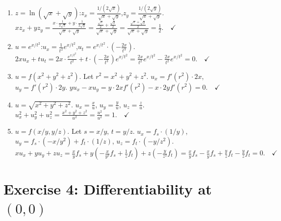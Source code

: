 \documentclass[12pt,a4paper]{article}
\begin{document}
\begin{enumerate}[leftmargin=*, label=(\alph*)]

\item $z=\ln(\sqrt{x}+\sqrt{y})$:\quad $z_x=\frac{1/(2\sqrt{x})}{\sqrt{x}+\sqrt{y}}$,\quad $z_y=\frac{1/(2\sqrt{y})}{\sqrt{x}+\sqrt{y}}$.
$xz_x+yz_y=\frac{x\cdot\frac{1}{2\sqrt{x}}+y\cdot\frac{1}{2\sqrt{y}}}{\sqrt{x}+\sqrt{y}}=\frac{\frac{\sqrt{x}}{2}+\frac{\sqrt{y}}{2}}{\sqrt{x}+\sqrt{y}}=\frac{\frac{\sqrt{x}+\sqrt{y}}{2}}{\sqrt{x}+\sqrt{y}}=\frac{1}{2}.\quad\checkmark$

\item $u=e^{x/t^2}$:\quad $u_x=\frac{1}{t^2}e^{x/t^2}$,\quad $u_t=e^{x/t^2}\cdot\left(-\frac{2x}{t^3}\right)$.
$2xu_x+tu_t=2x\cdot\frac{e^{x/t^2}}{t^2}+t\cdot\left(-\frac{2x}{t^3}\right)e^{x/t^2}=\frac{2x}{t^2}e^{x/t^2}-\frac{2x}{t^2}e^{x/t^2}=0.\quad\checkmark$

\item $u=f(x^2+y^2+z^2)$. Let $r^2=x^2+y^2+z^2$. $u_x=f'(r^2)\cdot 2x$, $u_y=f'(r^2)\cdot 2y$.
$yu_x-xu_y=y\cdot 2xf'(r^2)-x\cdot 2yf'(r^2)=0.\quad\checkmark$

\item $u=\sqrt{x^2+y^2+z^2}$. $u_x=\frac{x}{u}$, $u_y=\frac{y}{u}$, $u_z=\frac{z}{u}$.
$u_x^2+u_y^2+u_z^2=\frac{x^2+y^2+z^2}{u^2}=\frac{u^2}{u^2}=1.\quad\checkmark$

\item $u=f(x/y, y/z)$. Let $s=x/y$, $t=y/z$.
$u_x=f_s\cdot(1/y)$, $u_y=f_s\cdot(-x/y^2)+f_t\cdot(1/z)$, $u_z=f_t\cdot(-y/z^2)$.
$xu_x+yu_y+zu_z=\frac{x}{y}f_s+y\left(-\frac{x}{y^2}f_s+\frac{1}{z}f_t\right)+z\left(-\frac{y}{z^2}f_t\right)=\frac{x}{y}f_s-\frac{x}{y}f_s+\frac{y}{z}f_t-\frac{y}{z}f_t=0.\quad\checkmark$

\end{enumerate}

\section*{Exercise 4: Differentiability at $(0,0)$}
\end{document}
